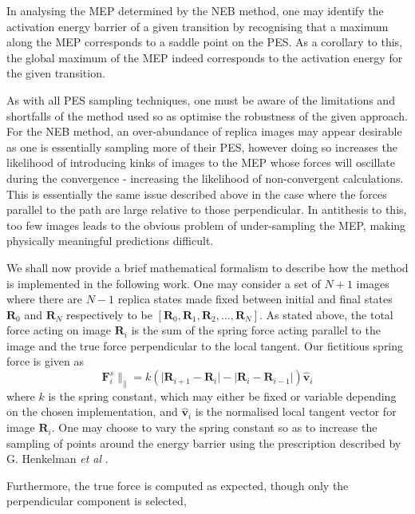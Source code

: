 In analysing the MEP determined by the NEB method, one may identify the activation energy barrier of a given transition by recognising that a maximum along the MEP corresponds to a saddle point on the PES. As a corollary to this, the global maximum of the MEP indeed corresponds to the activation energy for the given transition.

As with all PES sampling techniques, one must be aware of the limitations and shortfalls of the method used so as optimise the robustness of the given approach. For the NEB method, an over-abundance of replica images may appear desirable as one is essentially sampling more of their PES, however doing so increases the likelihood of introducing kinks of images to the MEP whose forces will oscillate during the convergence - increasing the likelihood of non-convergent calculations. This is essentially the same issue described above in the case where the forces parallel to the path are large relative to those perpendicular. In antithesis to this, too few images leads to the obvious problem of under-sampling the MEP, making physically meaningful predictions difficult.  

We shall now provide a brief mathematical formalism to describe how the method is implemented in the following work. One may consider a set of $N+1$ images where there are $N-1$ replica states made fixed between initial and final states $\textbf{R}_{0}$ and $\textbf{R}_{N}$ respectively to be $\left[ \textbf{R}_{0}, \textbf{R}_{1}, \textbf{R}_{2}, ..., \textbf{R}_{N} \right] $. As stated above, the total force acting on image $\textbf{R}_{i}$ is the sum of the spring force acting parallel to the image and the true force perpendicular to the local tangent. Our fictitious spring force is given as
\begin{equation}
    \textbf{F}_{i}^{s}\|_{\parallel} = k\left( \lvert \textbf{R}_{i+1} - \textbf{R}_{i} \rvert - \lvert \textbf{R}_{i} - \textbf{R}_{i-1} \rvert \right) \hat{\textbf{v}}_{i}
    \label{neb:spring}
\end{equation}
where $k$ is the spring constant, which may either be fixed or variable depending on the chosen implementation, and $\hat{\textbf{v}}_{i}$ is the normalised local tangent vector for image $\textbf{R}_i$. One may choose to vary the spring constant so as to increase the sampling of points around the energy barrier using the prescription described by G. Henkelman \textit{et al} \cite{NEB_Climb}.

Furthermore, the true force is computed as expected, though only the perpendicular component is selected, 

